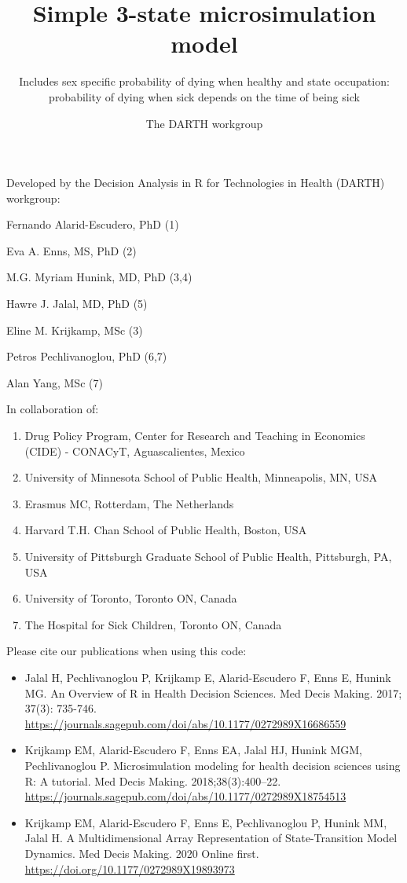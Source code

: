 \documentclass[]{article}
\title{Simple 3-state microsimulation model}
\subtitle{Includes sex specific probability of dying when healthy and state
occupation: probability of dying when sick depends on the time of being
sick}
\author{The DARTH workgroup}
\date{}
\providecommand{\tightlist}{%
  \setlength{\itemsep}{0pt}\setlength{\parskip}{0pt}}
\begin{document}
\maketitle

Developed by the Decision Analysis in R for Technologies in Health
(DARTH) workgroup:

Fernando Alarid-Escudero, PhD (1)

Eva A. Enns, MS, PhD (2)

M.G. Myriam Hunink, MD, PhD (3,4)

Hawre J. Jalal, MD, PhD (5)

Eline M. Krijkamp, MSc (3)

Petros Pechlivanoglou, PhD (6,7)

Alan Yang, MSc (7)

In collaboration of:

\begin{enumerate}
\def\labelenumi{\arabic{enumi}.}
\tightlist
\item
  Drug Policy Program, Center for Research and Teaching in Economics
  (CIDE) - CONACyT, Aguascalientes, Mexico
\item
  University of Minnesota School of Public Health, Minneapolis, MN, USA
\item
  Erasmus MC, Rotterdam, The Netherlands
\item
  Harvard T.H. Chan School of Public Health, Boston, USA
\item
  University of Pittsburgh Graduate School of Public Health, Pittsburgh,
  PA, USA
\item
  University of Toronto, Toronto ON, Canada
\item
  The Hospital for Sick Children, Toronto ON, Canada
\end{enumerate}

Please cite our publications when using this code:

\begin{itemize}
\item
  Jalal H, Pechlivanoglou P, Krijkamp E, Alarid-Escudero F, Enns E,
  Hunink MG. An Overview of R in Health Decision Sciences. Med Decis
  Making. 2017; 37(3): 735-746.
  \url{https://journals.sagepub.com/doi/abs/10.1177/0272989X16686559}
\item
  Krijkamp EM, Alarid-Escudero F, Enns EA, Jalal HJ, Hunink MGM,
  Pechlivanoglou P. Microsimulation modeling for health decision
  sciences using R: A tutorial. Med Decis Making. 2018;38(3):400--22.
  \url{https://journals.sagepub.com/doi/abs/10.1177/0272989X18754513}
\item
  Krijkamp EM, Alarid-Escudero F, Enns E, Pechlivanoglou P, Hunink MM,
  Jalal H. A Multidimensional Array Representation of State-Transition
  Model Dynamics. Med Decis Making. 2020 Online first.
  \url{https://doi.org/10.1177/0272989X19893973}
\end{itemize}
\end{document}
